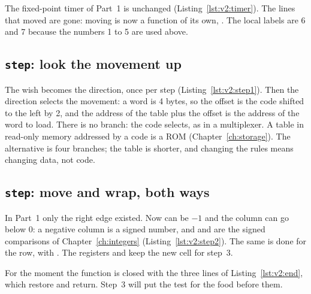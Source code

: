 The fixed-point timer of Part~1 is unchanged (Listing~\ref{lst:v2:timer}).
The lines that moved  are gone: moving is now a function of its
own, . The local labels are 6 and 7 because the numbers 1 to 5 are
used above.

\subsection{\texttt{step}: look the movement up}


The wish becomes the direction, once per step
(Listing~\ref{lst:v2:step1}). Then the direction selects the movement: a word
is 4 bytes, so the offset is the code shifted to the left by 2, and the
address of the table plus the offset is the address of the word to load.
There is no branch: the code selects, as in a multiplexer. A table in
read-only memory addressed by a code is a ROM (Chapter~\ref{ch:storage}). The
alternative is four branches; the table is shorter, and changing the rules
means changing data, not code.

\subsection{\texttt{step}: move and wrap, both ways}


In Part~1 only the right edge existed. Now  can be $-1$ and the
column can go below 0: a negative column is a signed number, and 
and  are the signed comparisons of Chapter~\ref{ch:integers}
(Listing~\ref{lst:v2:step2}). The same is done for the row, with
. The registers  and  keep the new cell for step~3.

For the moment the function is closed with the three lines of
Listing~\ref{lst:v2:end}, which restore  and return. Step~3 will put
the test for the food before them.



